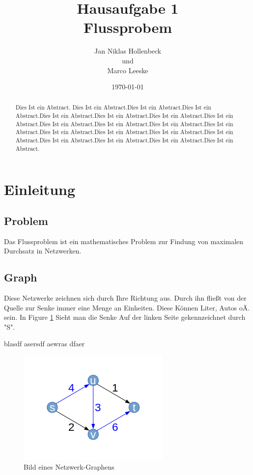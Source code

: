 \documentclass[11pt]{article}
\title{Hausaufgabe 1 \\ Flussprobem}
\author{Jan Niklas Hollenbeck \\ und \\ Marco Leeske}
\date{\today}
\begin{document}
\maketitle
\newpage
\begin{abstract}
Dies Ist ein Abstract. Dies Ist ein Abstract.Dies Ist ein Abstract.Dies Ist ein Abstract.Dies Ist ein Abstract.Dies Ist ein Abstract.Dies Ist ein Abstract.Dies Ist ein Abstract.Dies Ist ein Abstract.Dies Ist ein Abstract.Dies Ist ein Abstract.Dies Ist ein Abstract.Dies Ist ein Abstract.Dies Ist ein Abstract.Dies Ist ein Abstract.Dies Ist ein Abstract.Dies Ist ein Abstract.Dies Ist ein Abstract.Dies Ist ein Abstract.Dies Ist ein Abstract.
\end{abstract}

\section{Einleitung}
\subsection{Problem}
Das Flussproblem ist ein mathematisches Problem zur Findung von maximalen Durchsatz in Netzwerken.
\subsection{Graph}
Diese Netzwerke zeichnen sich durch Ihre Richtung aus. Durch ihn fließt von der Quelle zur Senke immer eine Menge an Einheiten. Diese Können Liter, Autos oÄ. sein. In Figure \ref{fig:Graph1} Sieht man die Senke Auf der linken Seite gekennzeichnet durch "S".

\citet{Jacobson1999Towards}blasdf asersdf aewras dfaer

\begin{figure}[htbp] 
  \centering
     \includegraphics{graph1} 
  \caption{Bild eines Netzwerk-Graphens}
  \label{fig:Graph1}
\end{figure}


\end{document}
